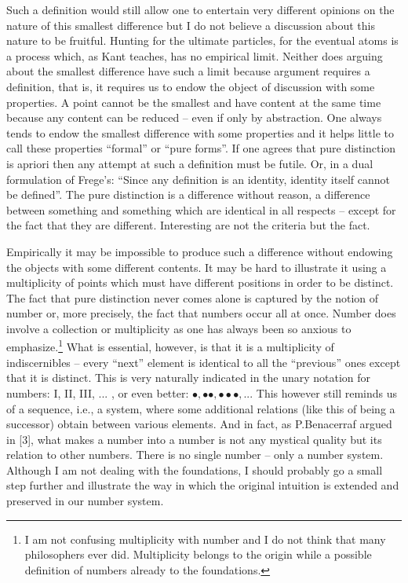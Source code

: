 Such a definition would still allow one to entertain very different opinions on the nature of this smallest difference but I do not believe a discussion about this nature to be fruitful. Hunting for the ultimate particles, for the eventual atoms is a process which, as Kant teaches, has no empirical limit. Neither does arguing about the smallest difference have such a limit because argument requires a definition, that is, it requires us to endow the object of discussion with some properties. A point cannot be the smallest and have content at the same time because any content can be reduced -- even if only by abstraction. One always tends to endow the smallest difference with some properties and it helps little to call these properties ``formal'' or ``pure forms''. If one agrees that pure distinction is apriori then any attempt at such a definition must be futile. Or, in a dual formulation of Frege's: ``Since any definition is an identity, identity itself cannot be defined''.
The pure distinction is a difference without reason, a difference between something and something which are identical in all respects -- except for the fact that they are different. Interesting are not the criteria but the fact. 

Empirically it may be impossible to produce such a difference without endowing the objects with some different contents. It may be hard to illustrate it using a multiplicity of points which must have different positions in order to be distinct. The fact that pure distinction never comes alone is captured by the notion of number or, more precisely, the fact that numbers occur all at once. Number does involve a collection or multiplicity as one has always been so anxious to emphasize.\footnote{I am not confusing multiplicity with number and I do not think that many philosophers ever did. Multiplicity belongs to the origin while a possible definition of numbers already to the foundations.}
What is essential, however, is that it is a multiplicity of indiscernibles -- every ``next'' element is identical to all the ``previous'' ones except that it is distinct. This is very naturally indicated in the unary notation for numbers: I, II, III, ... , or even better: $\bullet, \bullet\bullet, \bullet\bullet\bullet, ...$
This however still reminds us of a sequence, i.e., a system, where some additional relations (like this of being a successor) obtain between various elements. And in fact, as P.Benacerraf argued in [3], what makes a number into a number is not any mystical quality but its relation to other numbers. There is no single number -- only a number system. Although I am not dealing with the foundations, I should probably go a small step further and illustrate the way in which the original intuition is extended and preserved in our number system.

